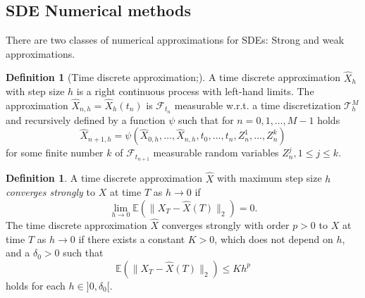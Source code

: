 \documentclass[12pt]{article}
\theoremstyle{definition}
\newtheorem{definition}[theorem]{Definition}
\numberwithin{equation}{section}
\newcommand{\norm}[1]{\lVert{#1}\rVert_2}
\begin{document}
\subsection{SDE Numerical methods}
\label{subsec:SdeNumericalMethods}
There are two classes of numerical approximations for SDEs: Strong and weak approximations. 
\begin{definition}[Time discrete approximation;]
  A time discrete approximation $\widehat{X}_h$ with step size $h$ is a right continuous process with left-hand limits. The approximation $\widehat{X}_{n,h} = \widehat{X}_h(t_n)$ is $\mathcal{F}_{t_n}$ measurable w.r.t. a time discretization $\mathcal{T}^M_h$ and recursively defined by a function $\psi$ such that for $n=0,1,\dots,M-1$ holds
  \begin{equation}
    \widehat{X}_{n+1, h} = \psi(\widehat{X}_{0,h}, \dots, \widehat{X}_{n,h}, t_0, \dots, t_n, Z^1_n,\dots, Z_n^k)
  \end{equation}
  for some finite number $k$ of $\mathcal{F}_{t_{n+1}}$ measurable random variables $Z^j_n, 1 \leq j \leq k$.
\end{definition}
\begin{definition}
  A time discrete approximation $\widehat{X}$ with maximum step size $h$ \emph{converges strongly} to $X$ at time $T$ as $h \rightarrow 0$ if 
  \begin{equation}
    \lim_{h \rightarrow 0} \mathbb{E}(\norm{X_T - \widehat{X}(T)}) = 0.
  \end{equation}
  The time discrete approximation $\widehat{X}$ converges strongly with order $p>0$ to $X$ at time $T$ as $h \rightarrow 0$ if there exists a constant $K > 0$, which does not depend on $h$, and a $\delta_0 > 0$ such that 
  \begin{equation}
    \mathbb{E}(\norm{X_T - \widehat{X}(T)}) \leq K h^p
  \end{equation}
  holds for each $h \in ]0, \delta_0[$.
\end{definition}
\end{document}
